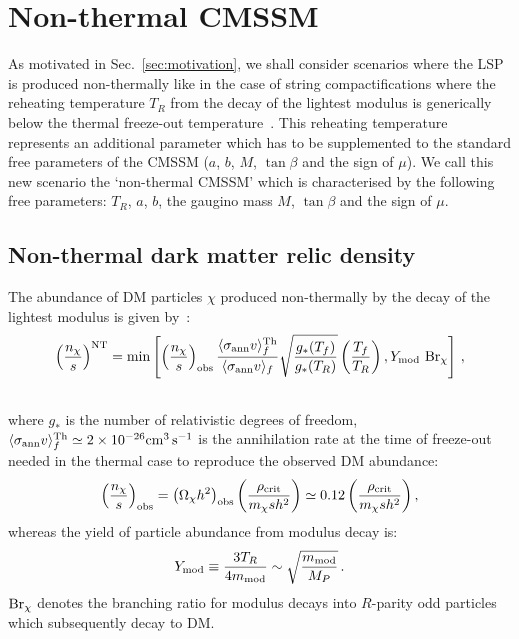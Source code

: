 \documentclass[11pt,a4paper]{article}
\newcommand{\bea}{\begin{eqnarray}}
\newcommand{\eea}{\end{eqnarray}}
\newcommand{\be}{\begin{equation}}
\newcommand{\ee}{\end{equation}}
\begin{document}
\section{Non-thermal CMSSM}
\label{SecResults}

As motivated in Sec.~\ref{sec:motivation}, we shall consider scenarios where the LSP is produced non-thermally like in the case of string compactifications where the reheating temperature $T_R$ from the decay of the lightest modulus is generically below the thermal freeze-out temperature~\cite{NTDM, Allahverdi:2013noa}.
This reheating temperature represents an additional parameter which has to be supplemented to the standard free parameters of the CMSSM ($a$, $b$, $M$, $\tan\beta$ and the sign of $\mu$). We call this new scenario the `non-thermal CMSSM' which is characterised by the following free parameters: $T_R$, $a$, $b$, the gaugino mass $M$, $\tan \beta$ and the sign of $\mu$.


\subsection{Non-thermal dark matter relic density}

The abundance of DM particles $\chi$ produced non-thermally by the decay of the lightest modulus is given by~\cite{Moroi:1999zb}:
\bea
\label{dmdens}
\left({n_\chi \over s}\right)^{\rm NT} = {\rm min} \left[\left({n_\chi \over s}\right)_{\rm obs}
{\langle \sigma_{\rm ann} v \rangle_f^{\rm Th} \over \langle \sigma_{\rm ann} v \rangle_f} \sqrt{\frac{g_*(T_f)}{g_*(T_R)}}\left({T_f \over T_R}\right),
Y_{\rm mod}~ {\rm Br}_\chi \right] \, , \nonumber \\
\,
\eea
where $g_*$ is the number of relativistic degrees of freedom, $\langle \sigma_{\rm ann} v \rangle_f^{\rm Th}\simeq 2 \times 10^{-26} {\rm cm}^3\,{\rm s}^{-1}$
is the annihilation rate at the time of freeze-out needed in the thermal case to reproduce the observed DM abundance:
\be
\left({n_\chi \over s}\right)_{\rm obs} = \left(\Omega_\chi h^2\right)_{\rm obs} \left(\frac{\rho_{\rm crit}}{m_\chi s h^2}\right) \simeq 0.12 \left(\frac{\rho_{\rm crit}}{m_\chi s h^2}\right),
\label{obs}
\ee
whereas the yield of particle abundance from modulus decay is:
\be
Y_{\rm mod} \equiv {3 T_R \over 4 m_{\rm mod}} \sim \sqrt{\frac{m_{\rm mod}}{M_P}}\,.
\label{yield}
\ee
${\rm Br}_\chi$ denotes the branching ratio for modulus decays into $R$-parity odd particles which subsequently decay to DM.
\end{document}
